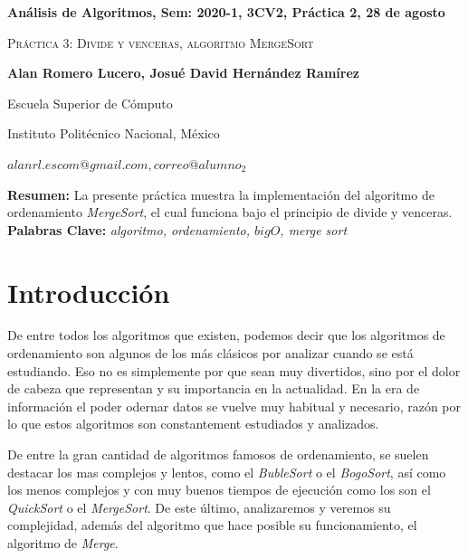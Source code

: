 \documentclass[12pt,twoside]{article}
\date{}
\begin{document}
\centerline{\bf An\'alisis de Algoritmos, Sem: 2020-1, 3CV2, Pr\'actica 2, 28 de agosto}
\centerline{}
\centerline{}
\begin{center}
\Large{\textsc{Pr\'actica 3: Divide y venceras, algoritmo MergeSort}}
\end{center}
\centerline{}
\centerline{\bf {Alan Romero Lucero, Josué David Hern\'andez Ram\'irez}}
\centerline{}
\centerline{Escuela Superior de C\'omputo}
\centerline{Instituto Polit\'ecnico Nacional, M\'exico}
\centerline{$alanrl.escom@gmail.com, correo@alumno_2$}
\newtheorem{Theorem}{\quad Theorem}[section]
\newtheorem{Definition}[Theorem]{\quad Definition}
\newtheorem{Corollary}[Theorem]{\quad Corollary}
\newtheorem{Lemma}[Theorem]{\quad Lemma}
\newtheorem{Example}[Theorem]{\quad Example}
\bigskip
\textbf{Resumen:} La presente pr\'actica muestra la implementaci\'on del algoritmo de ordenamiento \textit{MergeSort}, el cual funciona bajo el principio de divide y venceras.
{\bf Palabras Clave:} {\textit{algoritmo, ordenamiento, $big O$, merge sort}}
\section{Introducci\'on}
De entre todos los algoritmos que existen, podemos decir que los algoritmos de ordenamiento son algunos de los m\'as cl\'asicos por analizar cuando se est\'a estudiando. Eso no es simplemente por que sean muy divertidos, sino por el dolor de cabeza que representan y su importancia en la actualidad. En la era de informaci\'on el poder odernar datos se vuelve muy habitual y necesario, raz\'on por lo que estos algoritmos son constantement estudiados y analizados.

De entre la gran cantidad de algoritmos famosos de ordenamiento, se suelen destacar los mas complejos y lentos, como el \textit{BubleSort} o el \textit{BogoSort}, as\'i como los menos complejos y con muy buenos tiempos de ejecuci\'on como los son el \textit{QuickSort} o el \textit{MergeSort}. De este \'ultimo, analizaremos y veremos su complejidad, adem\'as del algoritmo que hace posible su funcionamiento, el algoritmo de \textit{Merge}.
\end{document}

